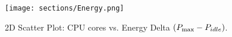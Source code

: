 \begin{figure}[H]
    \centering
    \texttt{[image: sections/Energy.png]}
    \caption{2D Scatter Plot: CPU cores vs. Energy Delta $(P_{\max} - P_{\begin{footnotesize}idle\end{footnotesize}})$.}
    \label{fig:energy_delta}
\end{figure}

